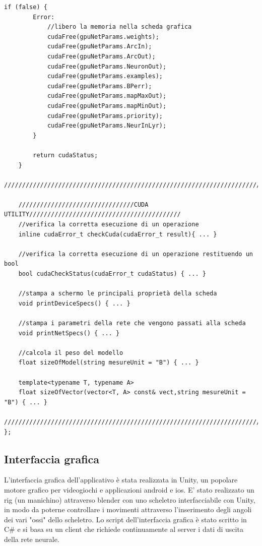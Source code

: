 \documentclass[10pt,a4paper]{article}
\begin{document}
\begin{lstlisting}[style=mycuda, caption= classe di interfaccia alla GPU, captionpos=b]
		if (false) {
		Error:
			//libero la memoria nella scheda grafica
			cudaFree(gpuNetParams.weights);
			cudaFree(gpuNetParams.ArcIn);
			cudaFree(gpuNetParams.ArcOut);
			cudaFree(gpuNetParams.NeuronOut);
			cudaFree(gpuNetParams.examples);
			cudaFree(gpuNetParams.BPerr);
			cudaFree(gpuNetParams.mapMaxOut);
			cudaFree(gpuNetParams.mapMinOut);
			cudaFree(gpuNetParams.priority);
			cudaFree(gpuNetParams.NeurInLyr);
		}

		return cudaStatus;
	}
	//////////////////////////////////////////////////////////////////////////////////////
	
	////////////////////////////////CUDA UTILITY//////////////////////////////////////////
	//verifica la corretta esecuzione di un operazione
	inline cudaError_t checkCuda(cudaError_t result){ ... }
	
	//verifica la corretta esecuzione di un operazione restituendo un bool
	bool cudaCheckStatus(cudaError_t cudaStatus) { ... }
	
	//stampa a schermo le principali proprietà della scheda
	void printDeviceSpecs() { ... }
	
	//stampa i parametri della rete che vengono passati alla scheda
	void printNetSpecs() { ... }
	
	//calcola il peso del modello
	float sizeOfModel(string mesureUnit = "B") { ... }
	
	template<typename T, typename A>
	float sizeOfVector(vector<T, A> const& vect,string mesureUnit = "B") { ... }
	//////////////////////////////////////////////////////////////////////////////////////
};

\end{lstlisting}

\subsection{Interfaccia grafica}
L'interfaccia grafica dell'applicativo è stata realizzata in Unity, un popolare motore grafico per videogiochi e applicazioni android e ios.
E' stato realizzato un rig (un manichino) attraverso blender con uno scheletro interfacciabile con Unity, in modo da poterne controllare i movimenti attraverso l'inserimento degli angoli dei vari "ossi" dello scheletro.
Lo script dell'interfaccia grafica è stato scritto in C\# e si basa su un client che richiede continuamente al server i dati di uscita della rete neurale.
\end{document}
